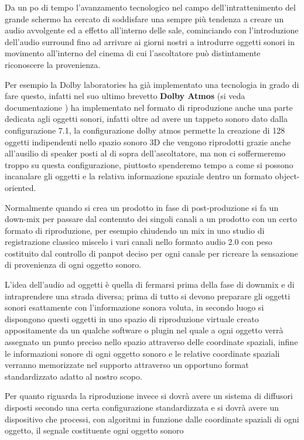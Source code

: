 \documentclass[12pt,a4paper]{report}
\begin{document}
Da un po di tempo l'avanzamento tecnologico nel campo dell'intrattenimento del grande schermo ha cercato di soddisfare una sempre più tendenza a creare un audio avvolgente ed a effetto all'interno delle sale, cominciando con l'introduzione dell'audio surround fino ad arrivare ai giorni nostri a introdurre oggetti sonori in movimento all'interno del cinema di cui l'ascoltatore può distintamente riconoscere la provenienza.

Per esempio la Dolby laboratories ha già implementato una tecnologia in grado di fare questo, infatti nel suo ultimo brevetto \textbf{Dolby Atmos} (si veda documentazione \cite{atmos}) ha implementato nel formato di riproduzione anche una parte dedicata agli oggetti sonori, infatti oltre ad avere un tappeto sonoro dato dalla configurazione 7.1, la configurazione dolby atmos permette la creazione di 128 oggetti indipendenti nello spazio sonoro 3D che vengono riprodotti grazie anche all'ausilio di speaker posti al di sopra dell'ascoltatore, ma non ci soffermeremo troppo su questa configurazione, piuttosto spenderemo tempo a come si possono incanalare gli oggetti e la relativa informazione spaziale dentro un formato object-oriented.

Normalmente quando si crea un prodotto in fase di post-produzione si fa un down-mix per passare dal contenuto dei singoli canali a un prodotto con un certo formato di riproduzione, per esempio chiudendo un mix in uno studio di registrazione classico miscelo i vari canali nello formato audio 2.0 con peso costituito dal controllo di panpot deciso per ogni canale per ricreare la sensazione di provenienza di ogni oggetto sonoro.

L'idea dell'audio ad oggetti è quella di fermarsi prima della fase di downmix e di intraprendere una strada diversa; prima di tutto si devono preparare gli oggetti sonori esattamente con l'informazione sonora voluta, in secondo luogo si dispongono questi oggetti in uno spazio di riproduzione virtuale creato appositamente da un qualche software o plugin nel quale a ogni oggetto verrà assegnato un punto preciso nello spazio attraverso delle coordinate spaziali, infine le informazioni sonore di ogni oggetto sonoro e le relative coordinate spaziali verranno memorizzate nel supporto attraverso un opportuno format standardizzato adatto al nostro scopo.

Per quanto riguarda la riproduzione invece si dovrà avere un sistema di diffusori disposti secondo una certa configurazione standardizzata e si dovrà avere un dispositivo che processi, con algoritmi in funzione dalle coordinate spaziali di ogni oggetto, il segnale costituente ogni oggetto sonoro
\end{document}
